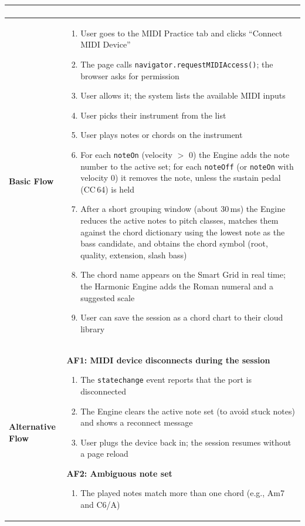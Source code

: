\documentclass[a4paper]{article}
\newlength{\ucLeft}
\begin{document}
\begin{longtable}{|>{\bfseries}p{\ucLeft}|p{\dimexpr\linewidth-\ucLeft-2\tabcolsep-2\arrayrulewidth}|}
\begin{itemize}[leftmargin=1em, nosep, topsep=2pt, partopsep=0pt, parsep=0pt, after=\strut]
\end{itemize}
\\ \hline
Basic Flow &
\begin{enumerate}[leftmargin=1.5em, nosep, topsep=2pt, partopsep=0pt, parsep=0pt, after=\strut]
    \item User goes to the MIDI Practice tab and clicks ``Connect MIDI Device''
    \item The page calls \texttt{navigator.requestMIDIAccess()}; the browser asks for permission
    \item User allows it; the system lists the available MIDI inputs
    \item User picks their instrument from the list
    \item User plays notes or chords on the instrument
    \item For each \texttt{noteOn} (velocity $>$ 0) the Engine adds the note number to the active set; for each \texttt{noteOff} (or \texttt{noteOn} with velocity 0) it removes the note, unless the sustain pedal (CC\,64) is held
    \item After a short grouping window (about 30\,ms) the Engine reduces the active notes to pitch classes, matches them against the chord dictionary using the lowest note as the bass candidate, and obtains the chord symbol (root, quality, extension, slash bass)
    \item The chord name appears on the Smart Grid in real time; the Harmonic Engine adds the Roman numeral and a suggested scale
    \item User can save the session as a chord chart to their cloud library
\end{enumerate}
\\ \hline
Alternative Flow &
\textbf{AF1: MIDI device disconnects during the session}
\begin{enumerate}[leftmargin=1.5em, nosep, topsep=2pt, partopsep=0pt, parsep=0pt, after=\strut]
    \item The \texttt{statechange} event reports that the port is disconnected
    \item The Engine clears the active note set (to avoid stuck notes) and shows a reconnect message
    \item User plugs the device back in; the session resumes without a page reload
\end{enumerate}
\textbf{AF2: Ambiguous note set}
\begin{enumerate}[leftmargin=1.5em, nosep, topsep=2pt, partopsep=0pt, parsep=0pt, after=\strut]
    \item The played notes match more than one chord (e.g., Am7 and C6/A)

\end{enumerate}
\end{longtable}
\end{document}
